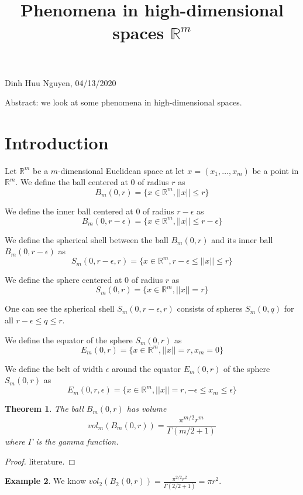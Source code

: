 \documentclass[11pt]{amsart}
\title{Phenomena in high-dimensional spaces $\mathbb{R}^m$}
\newtheorem{theorem}{Theorem}[section]
\theoremstyle{definition}
\newtheorem{example}[theorem]{Example}
\begin{document}
\maketitle

\begin{center}
Dinh Huu Nguyen, 04/13/2020
\end{center}
\vspace{20pt}

Abstract: we look at some phenomena in high-dimensional spaces.

\tableofcontents

\section{Introduction} Let $\mathbb{R}^m$ be a $m$-dimensional Euclidean space at let $x = (x_1, \dots , x_m)$ be a point in $\mathbb{R}^m$.
\dfn We define the ball centered at 0 of radius $r$ as
$$B_m(0, r) = \{x \in \mathbb{R}^m, ||x|| \leq r\}$$

\dfn We define the inner ball centered at 0 of radius $r - \epsilon$ as
$$B_m(0, r - \epsilon) = \{x \in \mathbb{R}^m, ||x|| \leq r - \epsilon\}$$

\dfn We define the spherical shell between the ball $B_m(0, r)$ and its inner ball $B_m(0, r - \epsilon)$ as
$$S_m(0, r - \epsilon, r) = \{x \in \mathbb{R}^m, r - \epsilon \leq ||x|| \leq r\}$$

\dfn We define the sphere centered at 0 of radius $r$ as
$$S_m(0, r) = \{x \in \mathbb{R}^m, ||x|| = r\}$$

One can see the spherical shell $S_m(0, r - \epsilon, r)$ consists of spheres $S_m(0, q)$ for all $r - \epsilon \leq q \leq r$.

\dfn We define the equator of the sphere $S_m(0, r)$ as
$$E_m(0, r) = \{x \in \mathbb{R}^m, ||x|| = r, x_m = 0\}$$

\dfn We define the belt of width $\epsilon$ around the equator $E_m(0, r)$ of the sphere $S_m(0, r)$ as
$$E_m(0, r, \epsilon) = \{x \in \mathbb{R}^m, ||x|| = r, -\epsilon \leq x_m \leq \epsilon\}$$

\begin{theorem} The ball $B_m(0, r)$ has volume
$$vol_m(B_m(0, r)) = \frac{\pi^{m/2} r^m}{\Gamma(m/2 + 1)}$$
where $\Gamma$ is the gamma function.
\end{theorem}
\begin{proof} literature.
\end{proof}

\begin{example} We know $vol_2(B_2(0, r)) = \frac{\pi^{2/2} r^2}{\Gamma(2/2 + 1)} = \pi r^2$.
\end{example}
\end{document}
